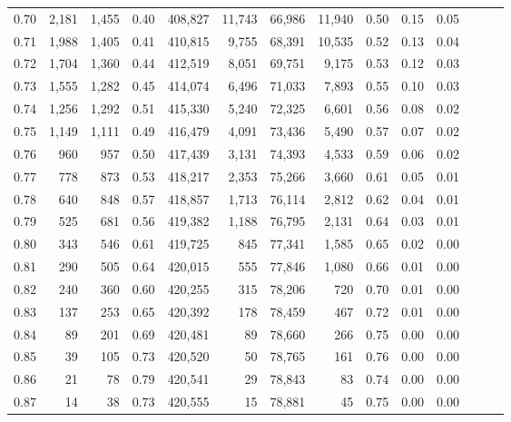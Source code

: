 \begin{tabular}{rrrrrrrrrrrrrr}
0.70 &   2,181 &  1,455 &  0.40 &  408,827 &   11,743 &  66,986 &  11,940 &  0.50 &  0.15 &      0.05 \\
0.71 &   1,988 &  1,405 &  0.41 &  410,815 &    9,755 &  68,391 &  10,535 &  0.52 &  0.13 &      0.04 \\
0.72 &   1,704 &  1,360 &  0.44 &  412,519 &    8,051 &  69,751 &   9,175 &  0.53 &  0.12 &      0.03 \\
0.73 &   1,555 &  1,282 &  0.45 &  414,074 &    6,496 &  71,033 &   7,893 &  0.55 &  0.10 &      0.03 \\
0.74 &   1,256 &  1,292 &  0.51 &  415,330 &    5,240 &  72,325 &   6,601 &  0.56 &  0.08 &      0.02 \\
0.75 &   1,149 &  1,111 &  0.49 &  416,479 &    4,091 &  73,436 &   5,490 &  0.57 &  0.07 &      0.02 \\
0.76 &     960 &    957 &  0.50 &  417,439 &    3,131 &  74,393 &   4,533 &  0.59 &  0.06 &      0.02 \\
0.77 &     778 &    873 &  0.53 &  418,217 &    2,353 &  75,266 &   3,660 &  0.61 &  0.05 &      0.01 \\
0.78 &     640 &    848 &  0.57 &  418,857 &    1,713 &  76,114 &   2,812 &  0.62 &  0.04 &      0.01 \\
0.79 &     525 &    681 &  0.56 &  419,382 &    1,188 &  76,795 &   2,131 &  0.64 &  0.03 &      0.01 \\
0.80 &     343 &    546 &  0.61 &  419,725 &      845 &  77,341 &   1,585 &  0.65 &  0.02 &      0.00 \\
0.81 &     290 &    505 &  0.64 &  420,015 &      555 &  77,846 &   1,080 &  0.66 &  0.01 &      0.00 \\
0.82 &     240 &    360 &  0.60 &  420,255 &      315 &  78,206 &     720 &  0.70 &  0.01 &      0.00 \\
0.83 &     137 &    253 &  0.65 &  420,392 &      178 &  78,459 &     467 &  0.72 &  0.01 &      0.00 \\
0.84 &      89 &    201 &  0.69 &  420,481 &       89 &  78,660 &     266 &  0.75 &  0.00 &      0.00 \\
0.85 &      39 &    105 &  0.73 &  420,520 &       50 &  78,765 &     161 &  0.76 &  0.00 &      0.00 \\
0.86 &      21 &     78 &  0.79 &  420,541 &       29 &  78,843 &      83 &  0.74 &  0.00 &      0.00 \\
0.87 &      14 &     38 &  0.73 &  420,555 &       15 &  78,881 &      45 &  0.75 &  0.00 &      0.00 \\

\end{tabular}
